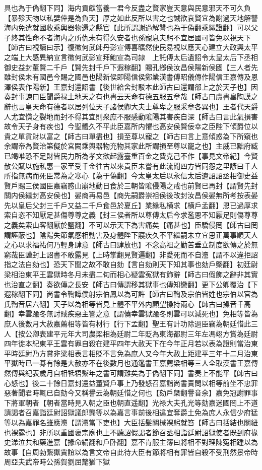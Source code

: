 具也為于偽翻下同】海内貢獻當養一君今反盡之賢家豈天意與民意邪天不可久負【暴殄天物以私嬖倖是為負天】厚之如此反所以害之也誠欲哀賢宜為謝過天地解讐海内免遣就國收乘輿器物還之縣官【此所謂謝過解讐也為于偽翻乘繩證翻】可以父子終其性命不者海内之所仇未有得久安者也孫寵息夫躬不宜居國可皆免以視天下【師古曰視讀曰示】復徵何武師丹彭宣傅喜曠然使民易視以應天心建立大政興太平之端上大感異納宣言徵何武彭宣拜鮑宣為司隸　上託傅太后遺詔令太皇太后下丞相御史益封董賢二千戶【賢先封千戶下遐稼翻】賜孔鄉侯汝昌侯陽新侯國【三人者先雖封侯未有國邑今賜之國邑也陽新侯即陽信侯鄭業漢書傅昭儀傳作陽信王嘉傳及恩澤侯表作陽新】王嘉封還詔書【後世給舍封駁本此師古曰還謂郤上之於天子也】因奏封事諫曰臣聞爵禄土地天之有也書云天命有德五服五章哉【師古曰虞書辠陶謨之辭也言皇天命有德者以居列位天子諸侯卿大夫士尊卑之服采章各異也】王者代天爵人尤宜愼之裂地而封不得其宜則衆庶不服感動隂陽其害疾自深【師古曰言此氣損害故令天子身有疾也】今聖體久不平此臣嘉所内懼也高安侯賢佞幸之臣陛下傾爵位以貴之單貨財以富之【師古曰單盡也】損至尊以寵之【師古曰言上意傾惑為下所窺也余謂帝為賢治第儗於宮闕乘輿器物充物其家此所謂損至尊以寵之也】主威已黜府臧已竭唯恐不足財皆民力所為孝文欲起露臺重百金之費克己不作【事見文帝紀】今賢散公賦以施私惠一家至受千金往古以來貴臣未嘗有此流聞四方皆同怨之里諺曰千人所指無病而死臣常為之寒心【為于偽翻】今太皇太后以永信太后遺詔詔丞相御史益賢戶賜三侯國臣嘉竊惑山崩地動日食於三朝皆隂侵陽之戒也前賢已再封【謂賢先封關内侯繼封高安侯也】晏商再易邑【商先嗣爵崇祖侯後改封汝昌侯晏無所考按表晏先以皇后父封三千戶又益二千戶食邑於夏丘】業緣私横求【横戶孟翻】恩已過厚求索自恣不知厭足甚傷尊尊之義【封三侯者所以尊傅太后今求濫恩不知厭足則傷尊尊之義矣索山客翻厭於鹽翻】不可以示天下為害痛矣【痛甚也】臣驕侵罔【師古曰罔謂誣蔽也】隂陽失節氣感相動害及身體陛下寢疾久不平繼嗣未立宜思正萬事順天人之心以求福祐何乃輕身肆意【師古曰肆放也】不念高祖之勤苦垂立制度欲傳之於無窮哉臣謹封上詔書不敢露見【上時掌翻見賢遍翻】非愛死而不自灋【謂不以違拒詔指之法自劾也】恐天下聞之故不敢自劾【言自劾則天下知其事也劾戶槩翻】初廷尉梁相治東平王雲獄時冬月未盡二旬而相心疑雲寃獄有飾辭【師古曰假飾之辭非其實也治直之翻】奏欲傳之長安【師古曰傳謂移其獄事也傳知戀翻】更下公卿覆治【下遐稼翻下同】尚書令鞫譚僕射宗伯鳳以為可許【師古曰鞫及宗伯皆姓也宗伯以官為氏鞫音居六翻】天子以為相等皆見上體不平外内顧望操持兩心【師古曰操音千高翻】幸雲踰冬無討賊疾惡主讐之意【謂僥幸雲獄踰冬則雲可以減死也】免相等皆為庶人後數月大赦嘉薦相等皆有材行【行下孟翻】聖王有計功除過臣竊為朝廷惜此三人【按公卿表建平元年大司農梁相為廷尉二年貶為東海都尉三年左馮翊方賞為廷尉四年徙本紀東平王雲有罪自殺在建平四年大赦天下在今年正月若以表為證則當治東平時廷尉乃方賞非梁相表言相貶不言免為庶人又今年大赦上距建平三年十二月治東平獄時已一朞有餘是大赦亦不在後數月也通鑑書王嘉薦梁相等三人全取漢書王嘉傳然傳與紀表歲月自相牴牾繫年之書可謂難矣為于偽翻下同】書奏上不能平【師古曰心怒也】後二十餘日嘉封還益董賢戶事上乃發怒召嘉詣尚書責問以相等前坐不忠罪惡著聞君時輒已自劾今又稱譽云為朝廷惜之何也【劾戶槩翻譽音余】嘉免冠謝罪事下將軍朝者【朝者當時見入朝之臣也朝直遥翻】光禄大夫孔光等劾嘉迷國罔上不道請謁者召嘉詣廷尉詔獄議郎龔等以為嘉言事前後相違宜奪爵土免為庶人永信少府猛等以為嘉罪名雖應灋【謂灋當下吏也】大臣括髮關械裸躬就笞【師古曰括結也關紐也裸露也】非所以重國褒宗廟也上不聽詔假謁者節召丞相詣廷尉詔獄使者既到府掾史涕泣共和藥進嘉【掾命絹翻和戶卧翻】嘉不肯服主簿曰將相不對理陳寃相踵以為故事【自周勃繋獄賈誼以為言文帝自此待大臣有節將相有罪皆自殺不受刑然景帝時周亞夫武帝時公孫賀劉屈氂猶下獄